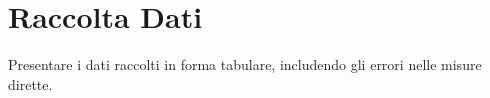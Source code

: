 \section{Raccolta Dati}
Presentare i dati raccolti in forma tabulare, includendo gli errori nelle misure dirette.

